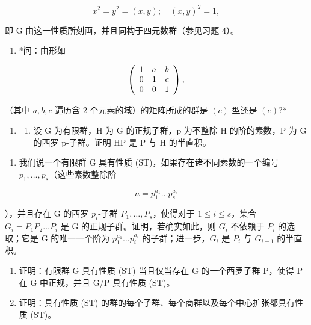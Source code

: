 \[
x ^ {2} = y ^ {2} = (x, y); \quad (x, y) ^ {2} = 1,
\]

即 G 由这一性质所刻画，并且同构于四元数群（参见习题 4）。

\begin{enumerate}
\def\labelenumi{(\alph{enumi})}
\setcounter{enumi}{5}
\tightlist
\item
  *问：由形如
\end{enumerate}

\[
\left( \begin{array}{c c c} 1 & a & b \\ 0 & 1 & c \\ 0 & 0 & 1 \end{array} \right),
\]

（其中 \(a, b, c\) 遍历含 2 个元素的域）的矩阵所成的群是 \((c)\) 型还是 \((e)?\)*

\begin{enumerate}
\def\labelenumi{\arabic{enumi}。}
\setcounter{enumi}{36}
\tightlist
\item
  \begin{enumerate}
  \def\labelenumii{(\alph{enumii})}
  \tightlist
  \item
    设 G 为有限群，H 为 G 的正规子群，p 为不整除 H 的阶的素数，P 为 G 的西罗 p-子群。证明 HP 是 P 与 H 的半直积。
  \end{enumerate}
\end{enumerate}

\begin{enumerate}
\def\labelenumi{(\alph{enumi})}
\setcounter{enumi}{1}
\tightlist
\item
  我们说一个有限群 G 具有性质 (ST)，如果存在诸不同素数的一个编号 \(p_{1}, \ldots, p_{s}\)（这些素数整除阶
\end{enumerate}

\[
n = p _ {1} ^ {a _ {1}} \dots p _ {s} ^ {a _ {s}}
\]

），并且存在 G 的西罗 \(p_i\)-子群 \(P_1, \ldots, P_s\)，使得对于 \(1 \leqslant i \leqslant s\)，集合 \(G_i = P_1P_2 \ldots P_i\) 是 G 的正规子群。证明，若确实如此，则 \(G_i\) 不依赖于 \(P_i\) 的选取；它是 G 的唯一一个阶为 \(p_1^{a_1} \ldots p_i^{a_i}\) 的子群；进一步，\(G_i\) 是 \(P_i\) 与 \(G_{i-1}\) 的半直积。

\begin{enumerate}
\def\labelenumi{(\alph{enumi})}
\setcounter{enumi}{2}
\item
  证明：有限群 G 具有性质 (ST) 当且仅当存在 G 的一个西罗子群 P，使得 P 在 G 中正规，并且 G/P 具有性质 (ST)。
\item
  证明：具有性质 (ST) 的群的每个子群、每个商群以及每个中心扩张都具有性质 (ST)。
\end{enumerate}

